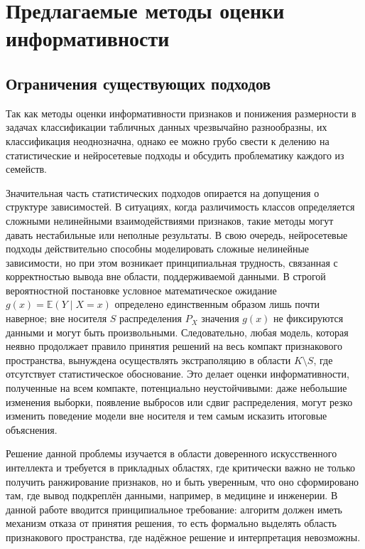 \documentclass[12pt,a4paper]{article}
\begin{document}
\section{Предлагаемые методы оценки информативности}

\subsection{Ограничения существующих подходов}

Так как методы оценки информативности признаков и понижения размерности в задачах классификации табличных данных чрезвычайно
разнообразны, их классификация неоднозначна, однако ее можно грубо свести к делению на 
статистические и нейросетевые подходы и обсудить проблематику каждого из семейств.

Значительная часть статистических подходов опирается на допущения о структуре зависимостей. 
В ситуациях, когда различимость классов определяется сложными нелинейными взаимодействиями 
признаков, такие методы могут давать нестабильные или неполные результаты. В свою очередь, 
нейросетевые подходы действительно способны моделировать сложные нелинейные зависимости,
но при этом возникает принципиальная трудность, связанная с корректностью вывода вне области,
поддерживаемой данными. В строгой вероятностной постановке условное математическое ожидание
\(
g(x)=\mathbb{E}(Y\mid X=x)
\)
определено единственным образом лишь почти наверное; вне носителя \(S\) распределения \(P_X\)
значения \(g(x)\) не фиксируются данными и могут быть произвольными. Следовательно,
любая модель, которая неявно продолжает правило принятия решений на весь компакт признакового
пространства, вынуждена осуществлять экстраполяцию в области \(K\setminus S\), где отсутствует 
статистическое обоснование. Это делает оценки информативности, полученные на всем компакте, 
потенциально неустойчивыми: даже небольшие изменения выборки, появление выбросов или сдвиг 
распределения, могут резко изменить поведение модели вне носителя и тем самым исказить итоговые объяснения.

Решение данной проблемы изучается в области доверенного искусственного интеллекта и требуется 
в прикладных областях, где критически важно не только получить ранжирование признаков, 
но и быть уверенным, что оно сформировано там, где вывод подкреплён данными, например, в 
медицине и инженерии. В данной работе вводится принципиальное требование: алгоритм должен иметь
механизм отказа от принятия решения, то есть формально выделять область признакового
пространства, где надёжное решение и интерпретация невозможны.
\end{document}
